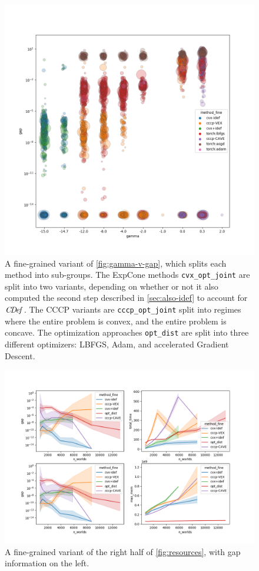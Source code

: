 \documentclass[twoside]{article}
\begin{document}
\begin{figure}
    \includegraphics[width=\linewidth]{figs/2}
    \caption{
        A fine-grained variant of \cref{fig:gamma-v-gap}, which splits each method into sub-groups.
        The ExpCone methods \texttt{cvx\_opt\_joint} are split into two variants, depending on whether or not it also computed the second step described in \cref{sec:also-idef} to account for $\mathit{C\mskip-3.5muD\mskip-2.5mue\mskip-1.5muf}_{}$.
        The CCCP variants are \texttt{cccp\_opt\_joint} split into regimes where the entire problem is convex, and the entire problem is concave. The optimization approaches \texttt{opt\_dist} are split into three different optimizers: LBFGS, Adam, and accelerated Gradient Descent.
    }\label{fig:gamma-v-gap-fine}
\end{figure}

\begin{figure}
    \includegraphics[width=\linewidth]{figs/1}
    \caption{
        A fine-grained variant of the right half of \cref{fig:resources},
        with gap information on the left.
    }\label{fig:gap-resource-fine}
\end{figure}
\end{document}
